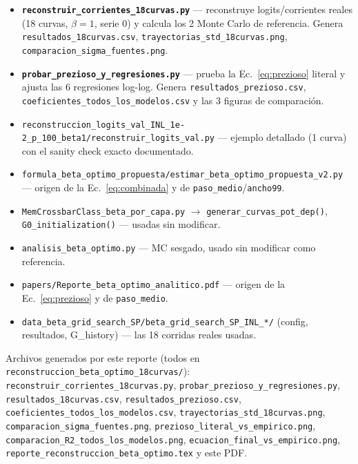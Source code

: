 \documentclass[11pt]{article}
\begin{document}
\begin{itemize}
\item \textbf{\texttt{reconstruir\_corrientes\_18curvas.py}} --- reconstruye
  logits/corrientes reales (18 curvas, $\beta=1$, serie 0) y calcula los 2
  Monte Carlo de referencia. Genera \texttt{resultados\_18curvas.csv},
  \texttt{trayectorias\_std\_18curvas.png}, \texttt{comparacion\_sigma\_fuentes.png}.
\item \textbf{\texttt{probar\_prezioso\_y\_regresiones.py}} --- prueba la
  Ec.~\ref{eq:prezioso} literal y ajusta las 6 regresiones log-log. Genera
  \texttt{resultados\_prezioso.csv}, \texttt{coeficientes\_todos\_los\_modelos.csv}
  y las 3 figuras de comparación.
\item \texttt{reconstruccion\_logits\_val\_INL\_1e-2\_p\_100\_beta1/reconstruir\_logits\_val.py} ---
  ejemplo detallado (1 curva) con el sanity check exacto documentado.
\item \texttt{formula\_beta\_optimo\_propuesta/estimar\_beta\_optimo\_propuesta\_v2.py} ---
  origen de la Ec.~\ref{eq:combinada} y de \texttt{paso\_medio}/\texttt{ancho99}.
\item \texttt{MemCrossbarClass\_beta\_por\_capa.py} $\to$
  \texttt{generar\_curvas\_pot\_dep()}, \texttt{G0\_initialization()} ---
  usadas sin modificar.
\item \texttt{analisis\_beta\_optimo.py} --- MC sesgado, usado sin modificar
  como referencia.
\item \texttt{papers/Reporte\_beta\_optimo\_analitico.pdf} --- origen de la
  Ec.~\ref{eq:prezioso} y de \texttt{paso\_medio}.
\item \texttt{data\_beta\_grid\_search\_SP/beta\_grid\_search\_SP\_INL\_*/}
  (config, resultados, G\_history) --- las 18 corridas reales usadas.
\end{itemize}

Archivos generados por este reporte (todos en
\texttt{reconstruccion\_beta\_optimo\_18curvas/}):
\texttt{reconstruir\_corrientes\_18curvas.py},
\texttt{probar\_prezioso\_y\_regresiones.py},
\texttt{resultados\_18curvas.csv}, \texttt{resultados\_prezioso.csv},
\texttt{coeficientes\_todos\_los\_modelos.csv},
\texttt{trayectorias\_std\_18curvas.png}, \texttt{comparacion\_sigma\_fuentes.png},
\texttt{prezioso\_literal\_vs\_empirico.png},
\texttt{comparacion\_R2\_todos\_los\_modelos.png},
\texttt{ecuacion\_final\_vs\_empirico.png},
\texttt{reporte\_reconstruccion\_beta\_optimo.tex} y este PDF.
\end{document}
